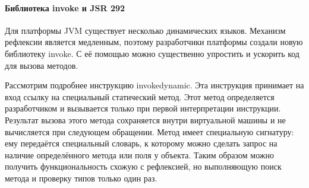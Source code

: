\paragraph{Библиотека invoke и JSR 292}
Для платформы JVM существует несколько динамических языков. Механизм рефлексии является медленным, поэтому разработчики платформы создали новую библиотеку invoke. С её помощью можно существенно упростить и ускорить код для вызова методов.

Рассмотрим подробнее инструкцию invokedynamic. Эта инструкция принимает на вход ссылку на специальный статический метод. Этот метод определяется разработчиком и вызывается только при первой интерпретации инструкции. Результат вызова этого метода сохраняется внутри виртуальной машины и не вычисляется при следующем обращении. Метод имеет специальную сигнатуру: ему передаётся специальный словарь, к которому можно сделать запрос на наличие определённого метода или поля у объекта. Таким образом можно получить функциональность схожую с рефлексией, но выполняющую поиск метода и проверку типов только один раз.
